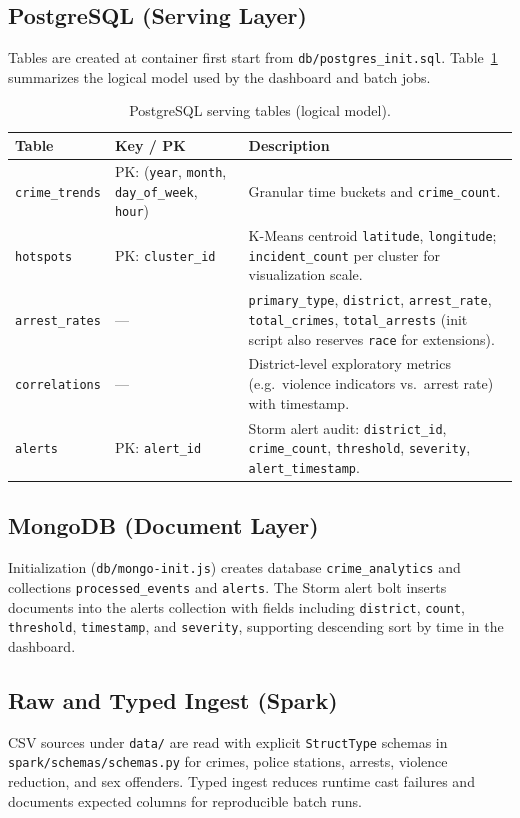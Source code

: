 \documentclass[12pt,a4paper]{article}
\begin{document}
\subsection{PostgreSQL (Serving Layer)}
Tables are created at container first start from \texttt{db/postgres\_init.sql}. Table~\ref{tab:pgschema} summarizes the logical model used by the dashboard and batch jobs.

\begin{table}[ht]
\centering
\small
\begin{tabular}{@{}llp{6.8cm}@{}}
\toprule
\textbf{Table} & \textbf{Key / PK} & \textbf{Description} \\
\midrule
\texttt{crime\_trends} & PK: (\texttt{year}, \texttt{month}, \texttt{day\_of\_week}, \texttt{hour}) & Granular time buckets and \texttt{crime\_count}. \\
\texttt{hotspots} & PK: \texttt{cluster\_id} & K-Means centroid \texttt{latitude}, \texttt{longitude}; \texttt{incident\_count} per cluster for visualization scale. \\
\texttt{arrest\_rates} & --- & \texttt{primary\_type}, \texttt{district}, \texttt{arrest\_rate}, \texttt{total\_crimes}, \texttt{total\_arrests} (init script also reserves \texttt{race} for extensions). \\
\texttt{correlations} & --- & District-level exploratory metrics (e.g.\ violence indicators vs.\ arrest rate) with timestamp. \\
\texttt{alerts} & PK: \texttt{alert\_id} & Storm alert audit: \texttt{district\_id}, \texttt{crime\_count}, \texttt{threshold}, \texttt{severity}, \texttt{alert\_timestamp}. \\
\bottomrule
\end{tabular}
\caption{PostgreSQL serving tables (logical model).}
\label{tab:pgschema}
\end{table}

\subsection{MongoDB (Document Layer)}
Initialization (\texttt{db/mongo-init.js}) creates database \texttt{crime\_analytics} and collections \texttt{processed\_events} and \texttt{alerts}. The Storm alert bolt inserts documents into the alerts collection with fields including \texttt{district}, \texttt{count}, \texttt{threshold}, \texttt{timestamp}, and \texttt{severity}, supporting descending sort by time in the dashboard.

\subsection{Raw and Typed Ingest (Spark)}
CSV sources under \texttt{data/} are read with explicit \texttt{StructType} schemas in \texttt{spark/schemas/schemas.py} for crimes, police stations, arrests, violence reduction, and sex offenders. Typed ingest reduces runtime cast failures and documents expected columns for reproducible batch runs.
\end{document}
